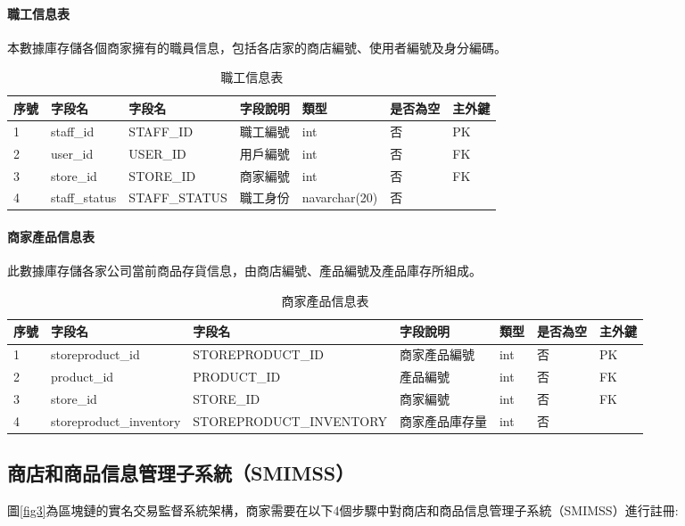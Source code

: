 			\paragraph{職工信息表}本數據庫存儲各個商家擁有的職員信息，包括各店家的商店編號、使用者編號及身分編碼。
				\begin{table}[htbp]
				\centering
				\caption{職工信息表}
				\label{staff}
				\begin{tabular}{|l|l|l|l|l|l|l|}
				\hline
				序號 & 字段名 & 字段名 & 字段說明 & 類型 & 是否為空 & 主外鍵 \\ \hline
				1 & staff\_id & STAFF\_ID & 職工編號 & int & 否 & PK \\ \hline
				2 & user\_id & USER\_ID & 用戶編號 & int & 否 & FK \\ \hline
				3 & store\_id & STORE\_ID & 商家編號 & int & 否 & FK \\ \hline
				4 & staff\_status & STAFF\_STATUS & 職工身份 & navarchar(20) & 否 &  \\ \hline
				\end{tabular}
				\end{table}

			\paragraph{商家產品信息表}此數據庫存儲各家公司當前商品存貨信息，由商店編號、產品編號及產品庫存所組成。
				\begin{table}[htbp]
				\centering
				\caption{商家產品信息表}
				\label{storeproduct}
				\begin{tabular}{|l|l|l|l|l|l|l|}
				\hline
				序號 & 字段名 & 字段名 & 字段說明 & 類型 & 是否為空 & 主外鍵 \\ \hline
				1 & storeproduct\_id & STOREPRODUCT\_ID & 商家產品編號 & int & 否 & PK \\ \hline
				2 & product\_id & PRODUCT\_ID & 產品編號 & int & 否 & FK \\ \hline
				3 & store\_id & STORE\_ID & 商家編號 & int & 否 & FK \\ \hline
				4 & storeproduct\_inventory & STOREPRODUCT\_INVENTORY & 商家產品庫存量 & int & 否 &  \\ \hline
				\end{tabular}
				\end{table}

	\subsection{商店和商品信息管理子系統（SMIMSS）}
	圖\ref{fig3}為區塊鏈的實名交易監督系統架構，商家需要在以下4個步驟中對商店和商品信息管理子系統（SMIMSS）進行註冊:

